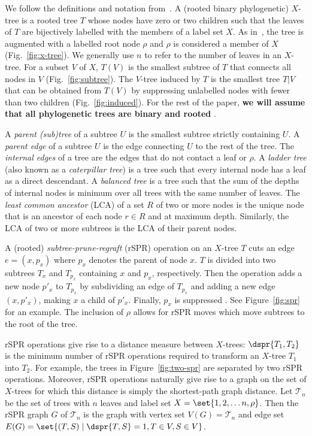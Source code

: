 \documentclass[11pt]{amsart}
\newcommand{\cuttable}[2][]{%
    \ifthenelse{\equal{#1}{}}%
		{}%
		{#1}%
}
\begin{document}
We follow the definitions and notation from~\cite{bordewich05,whidden2013hybridization, Whidden2015-yi}.
A (rooted binary phylogenetic) $X$-tree is a rooted tree $T$ whose nodes have zero or two children such that the leaves of $T$ are bijectively labelled with the members of a label set $X$.
As in~\cite{bordewich05,whidden2013hybridization,Whidden2015-yi}, the tree is augmented with a labelled root node $\rho$ and $\rho$ is considered a member of $X$ (Fig.~\ref{fig:x-tree}).
We generally use $n$ to refer to the number of leaves in an $X$-tree.
For a subset $V$ of $X$, $T(V)$ is the smallest subtree of $T$ that connects all nodes in $V$ (Fig.~\ref{fig:subtree}).
The $V$-tree induced by $T$ is the smallest tree $T|V$ that can be obtained from $T(V)$ by suppressing unlabelled nodes with fewer than two children (Fig.~\ref{fig:induced}).
For the rest of the paper, \textbf{we will assume that all phylogenetic trees are binary and rooted}\cuttable{, and thus that tree inclusion is rooted tree inclusion}.

A \emph{parent (sub)tree} of a subtree $U$ is the smallest subtree strictly containing $U$.
A \emph{parent edge} of a subtree $U$ is the edge connecting $U$ to the rest of the tree.
The \emph{internal edges} of a tree are the edges that do not contact a leaf or $\rho$.
A \emph{ladder tree} (also known as a \emph{caterpillar tree}) is a tree such that every internal node has a leaf as a direct descendant.
A \emph{balanced tree} is a tree such that the sum of the depths of internal nodes is minimum over all trees with the same number of leaves.
The \emph{least common ancestor} (LCA) of a set $R$ of two or more nodes is the unique node that is an ancestor of each node $r \in R$ and at maximum depth.
Similarly, the LCA of two or more subtrees is the LCA of their parent nodes.

A (rooted) \emph{subtree-prune-regraft} (rSPR) operation on an $X$-tree $T$ cuts an edge $e = (x, p_x)$ where $p_x$ denotes the parent of node $x$.
$T$ is divided into two subtrees $T_x$ and $T_{p_x}$ containing $x$ and $p_x$, respectively.
Then the operation adds a new node $p'_x$ to $T_{p_x}$ by subdividing an edge of $T_{p_x}$ and adding a new edge $(x, p'_x)$, making $x$ a child of $p'_x$.
Finally, $p_x$ is suppressed\cuttable{, joining the two edges on either side of that node}.
See Figure~\ref{fig:spr} for an example.
The inclusion of $\rho$ allows for rSPR moves which move subtrees to the root of the tree.

rSPR operations give rise to a distance measure between $X$-trees: $\dspr{T_1, T_2}$ is the minimum number of rSPR operations required to transform an $X$-tree $T_1$ into $T_2$.
For example, the trees in Figure~\ref{fig:two-spr} are separated by two rSPR operations.
Moreover, rSPR operations naturally give rise to a graph on the set of $X$-trees for which this distance is simply the shortest-path graph distance.
Let $\mathcal{T}_n$ be the set of trees with $n$ leaves and label set $X = \set{1, 2, \ldots n, \rho}$.
Then the rSPR graph $G$ of $\mathcal{T}_n$ is the graph with vertex set $V(G) = \mathcal{T}_n$ and edge set $E(G) = \set{(T,S) \mid \dspr{T,S} = 1, T \in V, S \in V}$.
\end{document}
